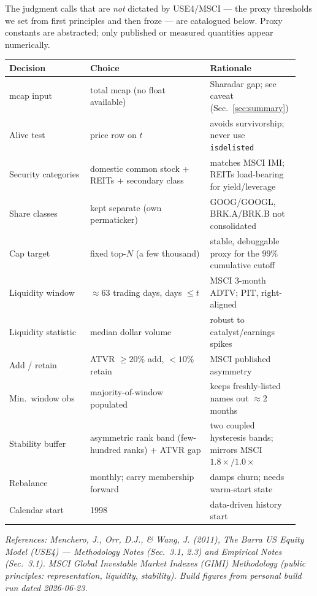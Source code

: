 \documentclass[11pt]{article}
\theoremstyle{definition}
\theoremstyle{plain}
\theoremstyle{remark}
\begin{document}
\smallskip
\noindent The judgment calls that are \emph{not} dictated by USE4/MSCI --- the proxy thresholds we set from first principles and then froze --- are catalogued below. Proxy constants are abstracted; only published or measured quantities appear numerically.

\begin{center}
\small
\begin{tabular}{@{}p{0.27\linewidth}p{0.40\linewidth}p{0.27\linewidth}@{}}
\toprule
Decision & Choice & Rationale \\
\midrule
mcap input & total mcap (no float available) & Sharadar gap; see caveat (Sec.\ \ref{sec:summary}) \\
Alive test & price row on $t$ & avoids survivorship; never use \texttt{isdelisted} \\
Security categories & domestic common stock + REITs + secondary class & matches MSCI IMI; REITs load-bearing for yield/leverage \\
Share classes & kept separate (own permaticker) & GOOG/GOOGL, BRK.A/BRK.B not consolidated \\
Cap target & fixed top-$N$ (a few thousand) & stable, debuggable proxy for the $99\%$ cumulative cutoff \\
Liquidity window & $\approx 63$ trading days, days $\le t$ & MSCI 3-month ADTV; PIT, right-aligned \\
Liquidity statistic & median dollar volume & robust to catalyst/earnings spikes \\
Add / retain & ATVR $\ge 20\%$ add, $< 10\%$ retain & MSCI published asymmetry \\
Min.\ window obs & majority-of-window populated & keeps freshly-listed names out $\approx 2$ months \\
Stability buffer & asymmetric rank band (few-hundred ranks) + ATVR gap & two coupled hysteresis bands; mirrors MSCI $1.8\times/1.0\times$ \\
Rebalance & monthly; carry membership forward & damps churn; needs warm-start state \\
Calendar start & 1998 & data-driven history start \\
\bottomrule
\end{tabular}
\end{center}

\begin{center}\small\itshape
References: Menchero, J., Orr, D.J., \& Wang, J. (2011), \emph{The Barra US Equity Model (USE4)} --- Methodology Notes (Sec.\ 3.1, 2.3) and Empirical Notes (Sec.\ 3.1). MSCI Global Investable Market Indexes (GIMI) Methodology (public principles: representation, liquidity, stability). Build figures from personal build run dated 2026-06-23.
\end{center}
\end{document}
